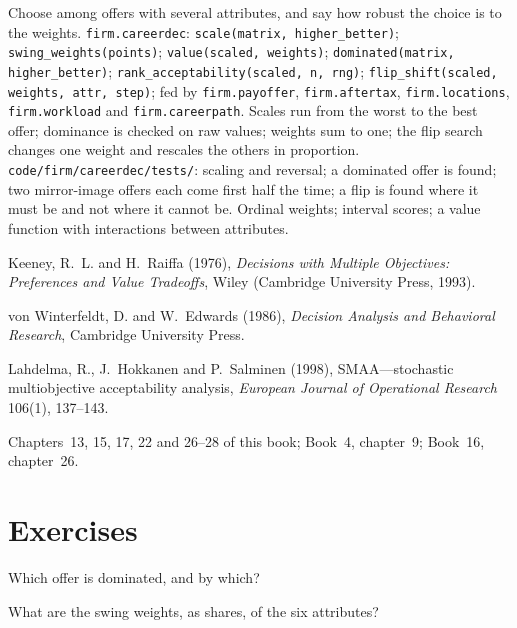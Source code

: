 \begin{build}
 Choose among offers with several attributes, and say how robust the choice is to the weights.
 \texttt{firm.careerdec}: \texttt{scale(matrix, higher\_better)}; \texttt{swing\_weights(points)};
\texttt{value(scaled, weights)}; \texttt{dominated(matrix, higher\_better)}; \texttt{rank\_acceptability(scaled, n,
rng)}; \texttt{flip\_shift(scaled, weights, attr, step)}; fed by \texttt{firm.payoffer}, \texttt{firm.aftertax},
\texttt{firm.locations}, \texttt{firm.workload} and \texttt{firm.careerpath}.
 Scales run from the worst to the best offer; dominance is checked on raw values; weights sum to one; the
flip search changes one weight and rescales the others in proportion.
 \texttt{code/firm/careerdec/tests/}: scaling and reversal; a dominated offer is found; two
mirror-image offers each come first half the time; a flip is found where it must be and not where it cannot be.
 Ordinal weights; interval scores; a value function with interactions between attributes.
\end{build}

\begin{omsources}
\item Keeney, R.~L. and H.~Raiffa (1976), \emph{Decisions with Multiple Objectives: Preferences and Value Tradeoffs},
Wiley (Cambridge University Press, 1993).
\item von Winterfeldt, D. and W.~Edwards (1986), \emph{Decision Analysis and Behavioral Research}, Cambridge University
Press.
\item Lahdelma, R., J.~Hokkanen and P.~Salminen (1998), SMAA---stochastic multiobjective acceptability analysis,
\emph{European Journal of Operational Research} 106(1), 137--143.
\item Chapters~13, 15, 17, 22 and 26--28 of this book; Book~4, chapter~9; Book~16, chapter~26.
\end{omsources}

\section{Exercises}

\begin{exercise}[$\star$]\label{exo:in:choosing:1}
Which offer is dominated, and by which?
\end{exercise}

\begin{exercise}[$\star$]\label{exo:in:choosing:2}
What are the swing weights, as shares, of the six attributes?
\end{exercise}

